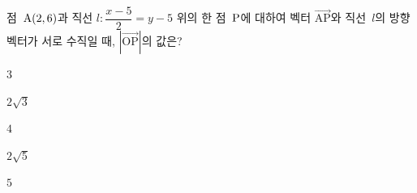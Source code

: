 점~$\mathrm{A}(2{,}\mkern3mu\mathopen{}6)$과 직선 $l\colon \dfrac{x-5}{2}=y-5$ 위의 한 점~$\mathrm{P}$에 대하여 벡터 $\overrightarrow{\mathrm{AP}}$와 직선~$l$의 방향벡터가 서로 수직일 때, $|\overrightarrow{\mathrm{OP}}|$의 값은? 
\begin{choices32}{\rule[-3ex]{0pt}{8ex}$3$}{\rule[-3ex]{0pt}{8ex}$2\sqrt{3}$}{\rule[-3ex]{0pt}{8ex}$4$}{\rule[-3ex]{0pt}{8ex}$2\sqrt{5}$}{\rule[-3ex]{0pt}{8ex}$5$}\end{choices32}
